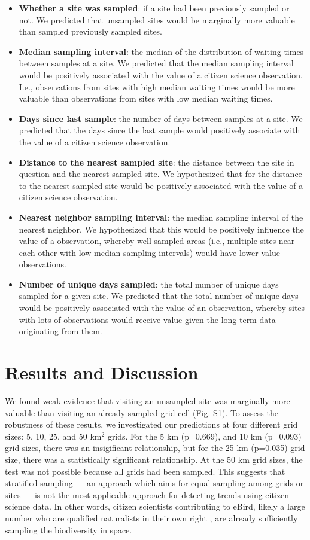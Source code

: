 \documentclass[9pt,twocolumn,twoside,lineno]{pnas-new}
\begin{document}
\begin{itemize}
  \item \textbf{Whether a site was sampled}: if a site had been previously sampled or not. We predicted that unsampled sites would be marginally more valuable than sampled previously sampled sites.
  \item \textbf{Median sampling interval}: the median of the distribution of waiting times between samples at a site. We predicted that the median sampling interval would be positively associated with the value of a citizen science observation. I.e., observations from sites with high median waiting times would be more valuable than observations from sites with low median waiting times.
  \item \textbf{Days since last sample}: the number of days between samples at a site. We predicted that the days since the last sample would positively associate with the value of a citizen science observation.
  \item \textbf{Distance to the nearest sampled site}: the distance between the site in question and the nearest sampled site. We hypothesized that for the distance to the nearest sampled site would be positively associated with the value of a citizen science observation.
  \item \textbf{Nearest neighbor sampling interval}: the median sampling interval of the nearest neighbor. We hypothesized that this would be positively influence the value of a observation, whereby well-sampled areas (i.e., multiple sites near each other with low median sampling intervals) would have lower value observations.
  \item \textbf{Number of unique days sampled}: the total number of unique days sampled for a given site. We predicted that the total number of unique days would be positively associated with the value of an observation, whereby sites with lots of observations would receive value given the long-term data originating from them.
\end{itemize}

\section*{Results and Discussion}
We found weak evidence that visiting an unsampled site was marginally more valuable than visiting an already sampled grid cell (Fig. S1). To assess the robustness of these results, we investigated our predictions at four different grid sizes: 5, 10, 25, and 50 km$^{2}$ grids. For the 5 km (p=0.669), and 10 km (p=0.093) grid sizes, there was an insigificant relationship, but for the 25 km (p=0.035) grid size, there was a statistically significant relationship. At the 50 km grid sizes, the test was not possible because all grids had been sampled. This suggests that stratified sampling --- an approach which aims for equal sampling among grids or sites --- \cite{baillie2008toward, longino1997biodiversity} is not the most applicable approach for detecting trends using citizen science data. In other words, citizen scientists contributing to eBird, likely a large number who are qualified naturalists in their own right \cite{callaghan2018unnatural}, are already sufficiently sampling the biodiversity in space.
\end{document}
